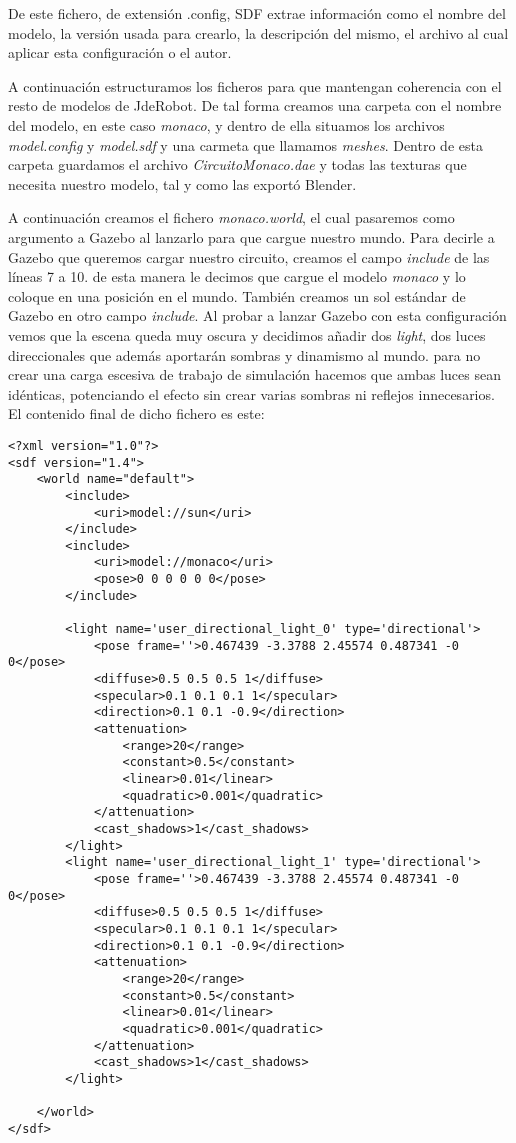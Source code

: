 De este fichero, de extensión .config, SDF extrae información como el nombre del modelo, la versión usada para crearlo, la descripción del mismo, el archivo al cual aplicar esta configuración o el autor.

A continuación estructuramos los ficheros para que mantengan coherencia con el resto de modelos de JdeRobot. De tal forma creamos una carpeta con el nombre del modelo, en este caso \textit{monaco}, y dentro de ella situamos los archivos \textit{model.config} y \textit{model.sdf} y una carmeta que llamamos \textit{meshes}. Dentro de esta carpeta guardamos el archivo \textit{CircuitoMonaco.dae} y todas las texturas que necesita nuestro modelo, tal y como las exportó Blender.

A continuación creamos el fichero \textit{monaco.world}, el cual pasaremos como argumento a Gazebo al lanzarlo para que cargue nuestro mundo. Para decirle a Gazebo que queremos cargar nuestro circuito, creamos el campo \textit{include} de las líneas 7 a 10. de esta manera le decimos que cargue el modelo \textit{monaco} y lo coloque en una posición en el mundo. También creamos un sol estándar de Gazebo en otro campo \textit{include}. Al probar a lanzar Gazebo con esta configuración vemos que la escena queda muy oscura y decidimos añadir dos \textit{light}, dos luces direccionales que además aportarán sombras y dinamismo al mundo. para no crear una carga escesiva de trabajo de simulación hacemos que ambas luces sean idénticas, potenciando el efecto sin crear varias sombras ni reflejos innecesarios. El contenido final de dicho fichero es este:
\lstset{language=xml}
\begin{lstlisting}
<?xml version="1.0"?>
<sdf version="1.4">
	<world name="default">
		<include>
			<uri>model://sun</uri>
		</include>
		<include>
			<uri>model://monaco</uri>
			<pose>0 0 0 0 0 0</pose>
		</include>

		<light name='user_directional_light_0' type='directional'>
			<pose frame=''>0.467439 -3.3788 2.45574 0.487341 -0 0</pose>
			<diffuse>0.5 0.5 0.5 1</diffuse>
			<specular>0.1 0.1 0.1 1</specular>
			<direction>0.1 0.1 -0.9</direction>
			<attenuation>
				<range>20</range>
				<constant>0.5</constant>
				<linear>0.01</linear>
				<quadratic>0.001</quadratic>
			</attenuation>
			<cast_shadows>1</cast_shadows>
		</light>
		<light name='user_directional_light_1' type='directional'>
			<pose frame=''>0.467439 -3.3788 2.45574 0.487341 -0 0</pose>
			<diffuse>0.5 0.5 0.5 1</diffuse>
			<specular>0.1 0.1 0.1 1</specular>
			<direction>0.1 0.1 -0.9</direction>
			<attenuation>
				<range>20</range>
				<constant>0.5</constant>
				<linear>0.01</linear>
				<quadratic>0.001</quadratic>
			</attenuation>
			<cast_shadows>1</cast_shadows>
		</light>

	</world>
</sdf>
\end{lstlisting}

